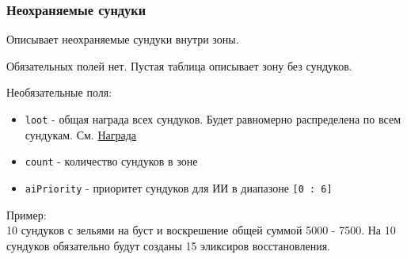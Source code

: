 \subsubsection{Неохраняемые сундуки}
\label{bags}
Описывает неохраняемые сундуки внутри зоны.

Обязательных полей нет. Пустая таблица описывает зону без сундуков.

Необязательные поля:
\begin{itemize}
\item \texttt{loot} - общая награда всех сундуков. Будет равномерно распределена по всем сундукам. См. \hyperref[loot]{Награда}
\item \texttt{count} - количество сундуков в зоне
\item \texttt{aiPriority} - приоритет сундуков для ИИ в диапазоне \texttt{[0 : 6]}
\end{itemize}

Пример:\\
10 сундуков с зельями на буст и воскрешение общей суммой 5000 - 7500.
На 10 сундуков обязательно будут созданы 15 эликсиров восстановления.

\begin{figure}[H]

\end{figure}